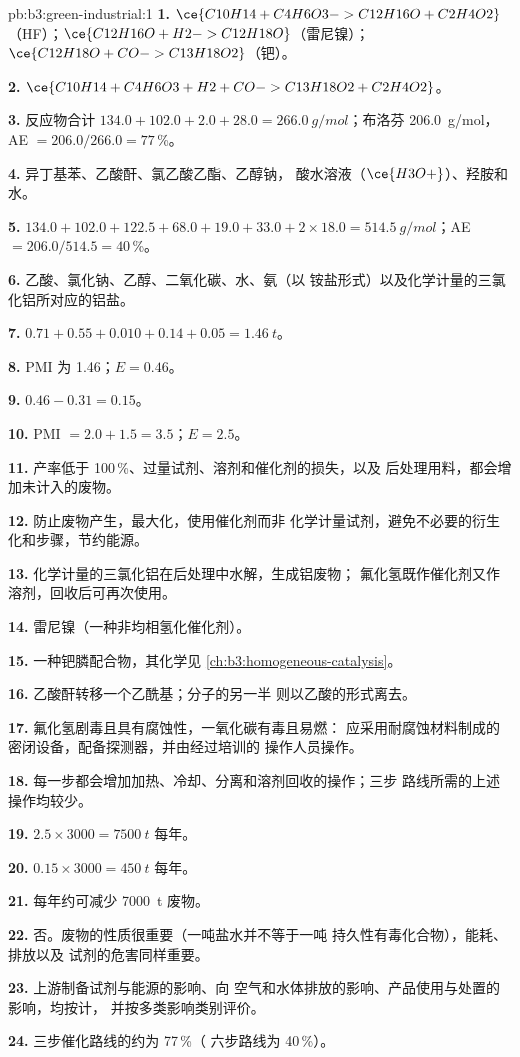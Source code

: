 \begin{solution}{pb:b3:green-industrial:1}
\textbf{1.} $\ce{C10H14 + C4H6O3 -> C12H16O + C2H4O2}$（HF）；$\ce{C12H16O + H2 -> C12H18O}$（雷尼镍）；
$\ce{C12H18O + CO -> C13H18O2}$（钯）。

\textbf{2.} $\ce{C10H14 + C4H6O3 + H2 + CO -> C13H18O2 + C2H4O2}$。

\textbf{3.} 反应物合计 $134.0 + 102.0 + 2.0 + 28.0 = \qty{266.0}{g/mol}$；布洛芬 \qty{206.0}{g/mol}，AE $= 206.0/266.0 = 77$\,\%。

\textbf{4.} 异丁基苯、乙酸酐、氯乙酸乙酯、乙醇钠，
酸水溶液（$\ce{H3O+}$）、羟胺和水。

\textbf{5.} $134.0 + 102.0 + 122.5 + 68.0 + 19.0 + 33.0 + 2 \times 18.0 = \qty{514.5}{g/mol}$；AE $= 206.0/514.5 = 40$\,\%。

\textbf{6.} 乙酸、氯化钠、乙醇、二氧化碳、水、氨（以
铵盐形式）以及化学计量的三氯化铝所对应的铝盐。

\textbf{7.} $0.71 + 0.55 + 0.010 + 0.14 + 0.05 = \qty{1.46}{t}$。

\textbf{8.} PMI 为 1.46；$E = 0.46$。

\textbf{9.} $0.46 - 0.31 = 0.15$。

\textbf{10.} PMI $= 2.0 + 1.5 = 3.5$；$E = 2.5$。

\textbf{11.} 产率低于 100\,\%、过量试剂、溶剂和催化剂的损失，以及
后处理用料，都会增加未计入的废物。

\textbf{12.} 防止废物产生，最大化，使用催化剂而非
化学计量试剂，避免不必要的衍生化和步骤，节约能源。

\textbf{13.} 化学计量的三氯化铝在后处理中水解，生成铝废物；
氟化氢既作催化剂又作溶剂，回收后可再次使用。

\textbf{14.} 雷尼镍（一种非均相氢化催化剂）。

\textbf{15.} 一种钯膦配合物，其化学见
\cref{ch:b3:homogeneous-catalysis}。

\textbf{16.} 乙酸酐转移一个乙酰基；分子的另一半
则以乙酸的形式离去。

\textbf{17.} 氟化氢剧毒且具有腐蚀性，一氧化碳有毒且易燃：
应采用耐腐蚀材料制成的密闭设备，配备探测器，并由经过培训的
操作人员操作。

\textbf{18.} 每一步都会增加加热、冷却、分离和溶剂回收的操作；三步
路线所需的上述操作均较少。

\textbf{19.} $2.5 \times 3000 = \qty{7500}{t}$ 每年。

\textbf{20.} $0.15 \times 3000 = \qty{450}{t}$ 每年。

\textbf{21.} 每年约可减少 \qty{7000}{t} 废物。

\textbf{22.} 否。废物的性质很重要（一吨盐水并不等于一吨
持久性有毒化合物），能耗、排放以及
试剂的危害同样重要。

\textbf{23.} 上游制备试剂与能源的影响、向
空气和水体排放的影响、产品使用与处置的影响，均按计，
并按多类影响类别评价。

\textbf{24.} 三步催化路线的约为 77\,\%（
六步路线为 40\,\%）。
\end{solution}
